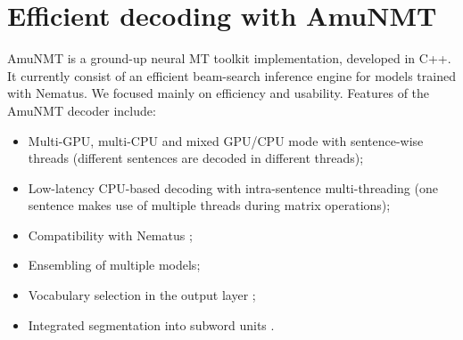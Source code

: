 \documentclass[11pt]{article}
\begin{document}
\section{Efficient decoding with AmuNMT}
AmuNMT is a ground-up neural MT toolkit implementation, developed in C++. It currently consist of an efficient beam-search inference engine for models trained with Nematus. We focused mainly on efficiency and usability. Features of the AmuNMT decoder include:

\begin{itemize}
 \item Multi-GPU, multi-CPU and mixed GPU/CPU mode with sentence-wise threads (different sentences are decoded in different threads);
  \item Low-latency CPU-based decoding with intra-sentence multi-threading (one sentence makes use of multiple threads during matrix operations);
 \item Compatibility with Nematus \cite{DBLP:conf/wmt/SennrichHB16};
 \item Ensembling of multiple models;
 \item Vocabulary selection in the output layer \cite{DBLP:conf/acl/JeanCMB15,DBLP:conf/acl/MiWI16};
 \item Integrated segmentation into subword units \cite{DBLP:journals/corr/SennrichHB15}.
\end{itemize}
\end{document}
